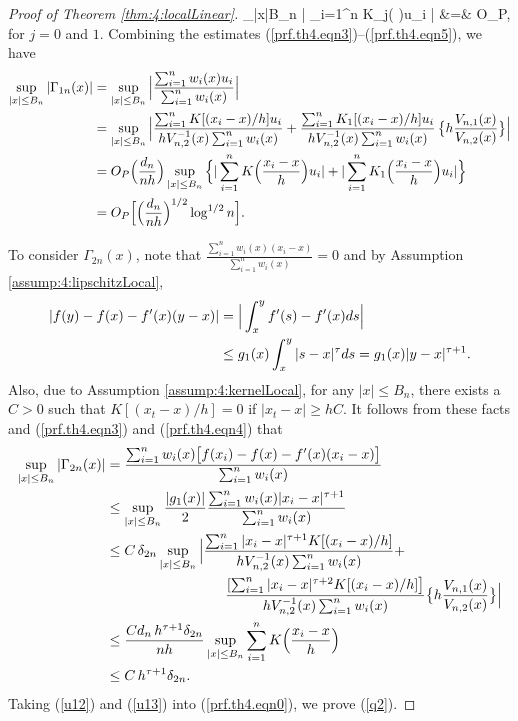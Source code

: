 \begin{proof}[Proof of Theorem \ref {thm:4:localLinear}]
\be
\sup_{|x|\le B_n} \Big | \sum_{i=1}^n K_j\Big ( \Big )u_i \Big | &=& O_P,
\ee
for $j = 0$ and $1$.
Combining the estimates (\ref{prf.th4.eqn3})--(\ref{prf.th4.eqn5}), we have
\begin{align}
 \sup_{|x| \le B_n} | \Gamma_{1n}(x) |  &=  \sup_{|x| \le B_n} \Big |\frac{\sum_{i = 1}^n w_i(x) u_i }{\sum_{i = 1}^n w_i(x)}  \Big | \no\\
 &= \sup_{|x| \le B_n} \Big | \frac{ \sum_{i = 1}^n K [(x_i - x)/h] u_i  }{  hV_{n,2}^{-1}(x) \sum_{i = 1}^n w_i(x)} + \frac{ \sum_{i = 1}^n  K_1[ (x_i - x)/h] u_i}{  hV_{n,2}^{-1}(x) \sum_{i = 1}^n w_i(x) }\,\big \{h\frac{ V_{n, 1}(x)}{V_{n,2}(x)}\big \}\Big | \no\\
 &= O_P \Big ( \frac{d_n}{n h} \Big ) \sup_{|x| \le B_n} \Big \{|\sum_{i = 1}^n K \Big (\frac{x_i - x}{h}\Big ) u_i| + | \sum_{i = 1}^n  K_1\Big (\frac{x_i - x}{h}\Big) u_i   | \Big \} \no\\
 &= O_P \Big [ \Big (\frac{d_n}{nh} \Big )^{1/2} \log^{1/2} n \Big ]. \la {u12}
 \end{align}

To consider  $\Gamma_{2n}(x)$, note that $\frac{\sum_{i = 1}^n w_i(x)  ( x_i-  x) }{\sum_{i = 1}^n w_i(x)}   = 0$ and by Assumption \ref{assump:4:lipschitzLocal},
\begin{align}
|f(y) - f(x) - f'(x)(y - x)| &= \Big | \int_x^y f'(s) - f'(x) ds\Big | \nonumber\\
&\le  g_1(x)\int_{x}^y |s - x|^{\tau} ds = g_1(x)|y - x|^{\tau + 1}. \nonumber
\end{align}
Also, due to Assumption \ref{assump:4:kernelLocal}, for any $|x| \le B_n$, there exists a $C>0$ such that $K[(x_t-x)/h]=0$ if $|x_t-x|\ge hC$. It follows from these facts and (\ref {prf.th4.eqn3}) and
(\ref {prf.th4.eqn4}) that
\begin{align}
\sup_{|x| \le B_n} | \Gamma_{2n}(x) | &= \frac{\sum_{i = 1}^n w_i(x) \big [ f(x_i) - f(x) - f'(x) (x_i - x) \big ] }{\sum_{i = 1}^n w_i(x)}  \no\\
&\le \sup_{|x| \le B_n} \frac{| g_1(x)|}{2} \frac{\sum_{i = 1}^n w_i(x)  | x_i-  x|^{\tau + 1} }{\sum_{i = 1}^n w_i(x)}  \no\\
&\le C\, \de_{2n}  \sup_{|x| \le B_n} \Big |\frac{ \sum_{i = 1}^n | x_i-  x|^{\tau + 1}K[ (x_i - x)/h]   }{ h V^{-1}_{n, 2}(x) \sum_{i = 1}^n w_i(x)}  +  \no\\
&\hskip 3cm \frac{ [\sum_{i = 1}^n | x_i-  x|^{\tau + 2}K [(x_i - x)/h]  \big ]}{ h V^{-1}_{n, 2}(x) \sum_{i = 1}^n w_i(x) } \big \{h\frac{ V_{n, 1}(x)}{V_{n,2}(x)}\big \}  \Big |\no\\
&\le  \frac{Cd_n\, h^{\tau + 1}\de_{2n} }{n h}  \sup_{|x| \le B_n} \sum_{i = 1}^n K \Big (\frac{x_i - x}{h} \Big )    \no\\
&\le C\,h^{\tau + 1} \de_{2n}.\la {u13}
\end{align} 
Taking (\ref {u12}) and (\ref {u13}) into (\ref {prf.th4.eqn0}), we prove (\ref {q2}).
\end{proof}



